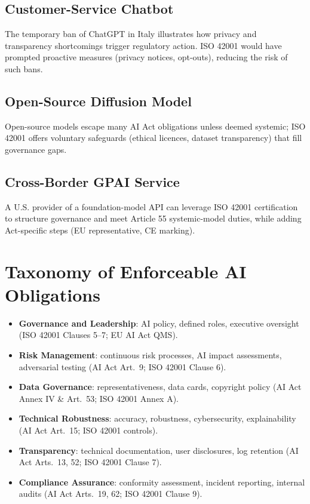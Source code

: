 \documentclass{article}
\begin{document}
\subsection{Customer-Service Chatbot}
The temporary ban of ChatGPT in Italy illustrates how privacy and transparency shortcomings trigger regulatory action. ISO 42001 would have prompted proactive measures (privacy notices, opt-outs), reducing the risk of such bans.

\subsection{Open-Source Diffusion Model}
Open-source models escape many AI Act obligations unless deemed systemic; ISO 42001 offers voluntary safeguards (ethical licences, dataset transparency) that fill governance gaps.

\subsection{Cross-Border GPAI Service}
A U.S. provider of a foundation-model API can leverage ISO 42001 certification to structure governance and meet Article 55 systemic-model duties, while adding Act-specific steps (EU representative, CE marking).

\section{Taxonomy of Enforceable AI Obligations}
\begin{itemize}
  \item \textbf{Governance and Leadership}: AI policy, defined roles, executive oversight (ISO 42001 Clauses 5–7; EU AI Act QMS).
  \item \textbf{Risk Management}: continuous risk processes, AI impact assessments, adversarial testing (AI Act Art.~9; ISO 42001 Clause 6).
  \item \textbf{Data Governance}: representativeness, data cards, copyright policy (AI Act Annex IV \& Art.~53; ISO 42001 Annex A).
  \item \textbf{Technical Robustness}: accuracy, robustness, cybersecurity, explainability (AI Act Art.~15; ISO 42001 controls).
  \item \textbf{Transparency}: technical documentation, user disclosures, log retention (AI Act Arts.~13, 52; ISO 42001 Clause 7).
  \item \textbf{Compliance Assurance}: conformity assessment, incident reporting, internal audits (AI Act Arts.~19, 62; ISO 42001 Clause 9).
\end{itemize}
\end{document}

